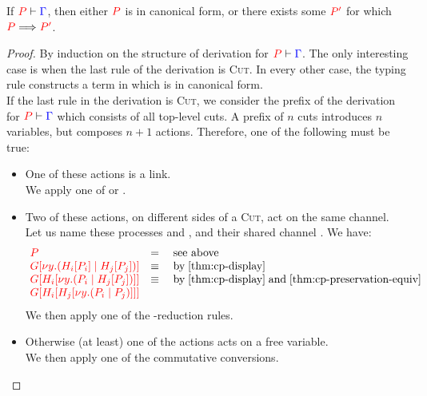 \begin{theorem}[Progress]\label{thm:cp-progress}
  If $\seq[{ P }]{ \Gamma }$,
  then either $\tm{P}$ is in canonical form,
  or there exists some $\tm{P'}$ for which $\reducesto{P}{P'}$.
\end{theorem}
\begin{proof}
  By induction on the structure of derivation for $\seq[{ P }]{ \Gamma }$.
  The only interesting case is when the last rule of the derivation is
  \textsc{Cut}. In every other case, the typing rule constructs a term in which
  is in canonical form. 
  \\
  If the last rule in the derivation is \textsc{Cut}, we consider the prefix of
  the derivation for $\seq[{ P }]{ \Gamma}$ which consists of all top-level
  cuts. A prefix of $n$ cuts introduces $n$ variables, but composes $n+1$
  actions. Therefore, one of the following must be true: 
  \begin{itemize}
  \item
    One of these actions is a link.
    \\
    We apply one of  or .
  \item
    Two of these actions, on different sides of a \textsc{Cut}, act on the same channel.
    \\
    Let us name these processes  and , and their shared channel .
    We have:
    \[\!
      \begin{array}{ll}
        \tm{P} & = \quad \text{see above}\\
        \tm{\cpPlug{G}{\cpCut{y}{\cpPlug{H_i}{P_i}}{\cpPlug{H_j}{P_j}}}} &
        \equiv \quad \text{by} \; \cref{thm:cp-display}\\
        \tm{\cpPlug{G}{\cpPlug{H_i}{\cpCut{y}{P_i}{\cpPlug{H_j}{P_j}}}}} &
        \equiv \quad \text{by} \; \cref{thm:cp-display} \; \text{and} \; \cref{thm:cp-preservation-equiv}\\
        \tm{\cpPlug{G}{\cpPlug{H_i}{\cpPlug{H_j}{\cpCut{y}{P_i}{P_j}}}}} & 
      \end{array}
    \]
    We then apply one of the \textbeta-reduction rules.
  \item
    Otherwise (at least) one of the actions acts on a free variable.
    \\
    We then apply one of the commutative conversions.
  \end{itemize}
\end{proof}
